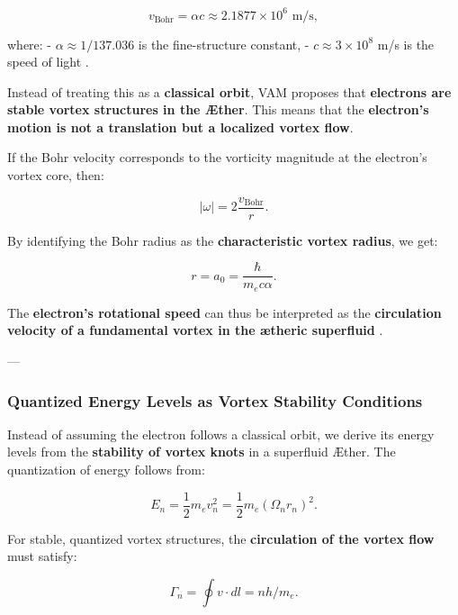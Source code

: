 \documentclass[a4paper,10pt]{article}
\begin{document}
\begin{equation*}
    v_\text{Bohr} = \alpha c \approx 2.1877 \times 10^6 \text{ m/s},
\end{equation*}

where:
- \( \alpha \approx 1/137.036 \) is the fine-structure constant,
- \( c \approx 3 \times 10^8 \) m/s is the speed of light \cite{bohr_atom, bethe_qmech}.

Instead of treating this as a \textbf{classical orbit}, VAM proposes that \textbf{electrons are stable vortex structures in the Æther}. This means that the \textbf{electron's motion is not a translation but a localized vortex flow}.

If the Bohr velocity corresponds to the vorticity magnitude at the electron's vortex core, then:

\begin{equation*}
    |\omega| = 2 \frac{v_\text{Bohr}}{r}.
\end{equation*}

By identifying the Bohr radius as the \textbf{characteristic vortex radius}, we get:

\begin{equation*}
    r = a_0 = \frac{\hbar}{m_e c \alpha}.
\end{equation*}

The \textbf{electron's rotational speed} can thus be interpreted as the \textbf{circulation velocity of a fundamental vortex in the ætheric superfluid} \cite{onsager_superfluid, feynman_superfluid}.

---

\subsubsection*{Quantized Energy Levels as Vortex Stability Conditions}

Instead of assuming the electron follows a classical orbit, we derive its energy levels from the \textbf{stability of vortex knots} in a superfluid Æther. The quantization of energy follows from:

\begin{equation*}
    E_n = \frac{1}{2} m_e v_n^2 = \frac{1}{2} m_e (\Omega_n r_n)^2.
\end{equation*}

For stable, quantized vortex structures, the \textbf{circulation of the vortex flow} must satisfy:

\begin{equation*}
    \Gamma_n = \oint v \cdot dl = n h / m_e.
\end{equation*}
\end{document}
